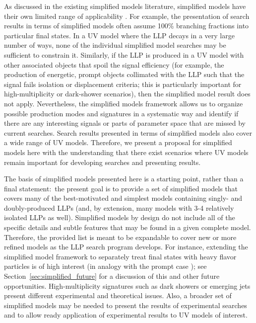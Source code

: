 As discussed in the existing simplified models literature, simplified models have their own limited range of applicability \cite{Alves:2011wf,Abdallah:2015ter}. For example, the presentation of search results in terms of simplified models often assume 100\% branching fractions into particular final states. In a UV model where the LLP decays in a very large number of ways, none of the individual simplified model searches may be sufficient to constrain it. Similarly, if the LLP is produced in a UV model with other associated objects that spoil the signal efficiency (for example, the production of energetic, prompt objects collimated with the LLP such that the signal fails isolation or displacement criteria; this is particularly important for high-multiplicity or dark-shower scenarios), then the simplified model result does not apply. Nevertheless, the simplified models framework allows us to organize possible production modes and signatures in a systematic way and identify if there are any interesting signals or parts of parameter space that are missed by current searches. Search results presented in terms of simplified models also cover a wide range of UV models. Therefore, we present a proposal for simplified models here with the understanding that there exist scenarios where UV models remain important for developing searches and presenting results.

The basis of simplified models presented here is  a starting point, rather than a final statement:~the present goal is to provide a set of simplified models that covers many of the best-motivated and simplest models containing singly- and doubly-produced LLPs (and, by extension, many models with 3-4 relatively isolated LLPs as well). Simplified models by design do not include all of the specific details and subtle features that may be found in a given complete model.  Therefore, the provided list is meant to be expandable to cover new or more refined models as the LLP search program develops.  For instance,  extending the simplified model framework to separately treat final states with heavy flavor particles is of high interest (in analogy with the prompt case \cite{Essig:2011qg,Brust:2011tb,Papucci:2011wy}); see Section~\ref{sec:simplified_future} for a discussion of this and other future opportunities.   High-multiplicity signatures such as dark showers or emerging jets present different experimental and theoretical issues. Also, a broader set of simplified models may be needed to present the results of experimental searches and to allow ready application of experimental results to UV models of interest. 


